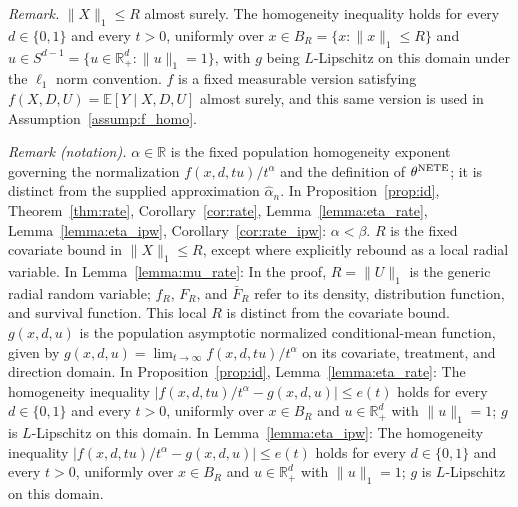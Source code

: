 \documentclass[12pt]{article}
\theoremstyle{plain}
\theoremstyle{definition}
\begin{document}
\noindent\textit{Remark.} $\|X\|_1\leqslant R$ almost surely. The homogeneity inequality holds for every $d\in\{0,1\}$ and every $t>0$, uniformly over $x\in B_R=\{x:\|x\|_1\leqslant R\}$ and $u\in S^{d-1}=\{u\in\mathbb R_+^d:\|u\|_1=1\}$, with $g$ being $L$-Lipschitz on this domain under the $\ell_1$ norm convention. $f$ is a fixed measurable version satisfying $f(X,D,U)=\mathbb{E}[Y\mid X,D,U]$ almost surely, and this same version is used in Assumption~\ref{assump:f_homo}.

\noindent\textit{Remark (notation).} $\alpha\in\mathbb R$ is the fixed population homogeneity exponent governing the normalization $f(x,d,tu)/t^\alpha$ and the definition of $\theta^{\operatorname{NETE}}$; it is distinct from the supplied approximation $\hat\alpha_n$. In Proposition~\ref{prop:id}, Theorem~\ref{thm:rate}, Corollary~\ref{cor:rate}, Lemma~\ref{lemma:eta_rate}, Lemma~\ref{lemma:eta_ipw}, Corollary~\ref{cor:rate_ipw}: $\alpha<\beta$. $R$ is the fixed covariate bound in $\|X\|_1\leqslant R$, except where explicitly rebound as a local radial variable. In Lemma~\ref{lemma:mu_rate}: In the proof, $R=\|U\|_1$ is the generic radial random variable; $f_R$, $F_R$, and $\bar F_R$ refer to its density, distribution function, and survival function. This local $R$ is distinct from the covariate bound. $g(x,d,u)$ is the population asymptotic normalized conditional-mean function, given by $g(x,d,u)=\lim_{t\to\infty}f(x,d,tu)/t^\alpha$ on its covariate, treatment, and direction domain. In Proposition~\ref{prop:id}, Lemma~\ref{lemma:eta_rate}: The homogeneity inequality $|f(x,d,tu)/t^\alpha-g(x,d,u)|\leqslant e(t)$ holds for every $d\in\{0,1\}$ and every $t>0$, uniformly over $x\in B_R$ and $u\in\mathbb R_+^d$ with $\|u\|_1=1$; $g$ is $L$-Lipschitz on this domain. In Lemma~\ref{lemma:eta_ipw}: The homogeneity inequality $|f(x,d,tu)/t^\alpha-g(x,d,u)|\leqslant e(t)$ holds for every $d\in\{0,1\}$ and every $t>0$, uniformly over $x\in B_R$ and $u\in\mathbb R_+^d$ with $\|u\|_1=1$; $g$ is $L$-Lipschitz on this domain.
\end{document}
